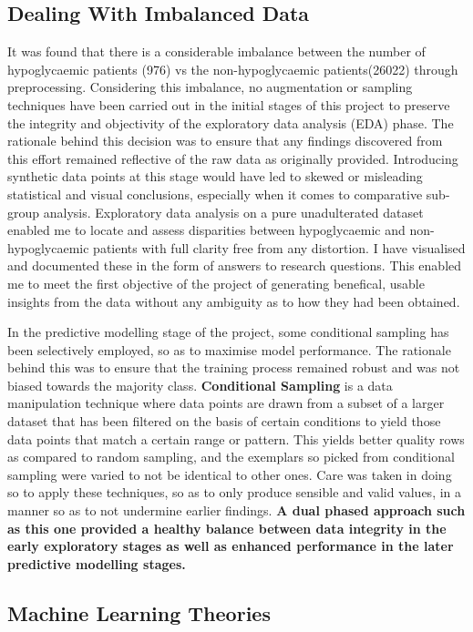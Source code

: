 	\subsection{Dealing With Imbalanced Data}
	\noindent It was found that there is a considerable imbalance between the number of hypoglycaemic patients (976) vs the non-hypoglycaemic patients(26022) through preprocessing. Considering this imbalance, no augmentation or sampling techniques have been carried out in the initial stages of this project to preserve the integrity and objectivity of the exploratory data analysis (EDA) phase. The rationale behind this decision was to ensure that any findings discovered from this effort remained reflective of the raw data as originally provided. Introducing synthetic data points at this stage would have led to skewed or misleading statistical and visual conclusions, especially when it comes to comparative sub-group analysis. Exploratory data analysis on a pure unadulterated dataset enabled me to locate and assess disparities between hypoglycaemic and non-hypoglycaemic patients with full clarity free from any distortion. I have visualised and documented these in the form of answers to research questions. This enabled me to meet the first objective of the project of generating benefical, usable insights from the data without any ambiguity as to how they had been obtained.

	\vspace{5pt}
	\noindent In the predictive modelling stage of the project, some conditional sampling has been selectively employed, so as to maximise model performance. The rationale behind this was to ensure that the training process remained robust and was not biased towards the majority class. \textbf{Conditional Sampling} is a data manipulation technique where data points are drawn from a subset of a larger dataset that has been filtered on the basis of certain conditions to yield those data points that match a certain range or pattern. This yields better quality rows as compared to random sampling, and the exemplars so picked from conditional sampling were varied to not be identical to other ones. Care was taken in doing so to apply these techniques, so as to only produce sensible and valid values, in a manner so as to not undermine earlier findings. \textbf{A dual phased approach such as this one provided a healthy balance between data integrity in the early exploratory stages as well as enhanced performance in the later predictive modelling stages. }

	\subsection{Machine Learning Theories}
	
